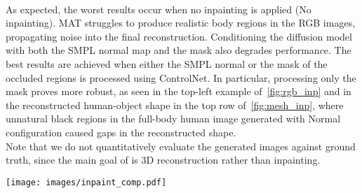 \\As expected, the worst results occur when no inpainting is applied (No inpainting). MAT struggles to produce realistic body regions in the RGB images, propagating noise into the final reconstruction. Conditioning the diffusion model with both the SMPL normal map and the mask also degrades performance. The best results are achieved when either the SMPL normal or the mask of the occluded regions is processed using ControlNet. In particular, processing only the mask proves more robust, as seen in the top-left example of~\cref{fig:rgb_inp} and in the reconstructed human-object shape in the top row of~\cref{fig:mesh_inp}, where unnatural black regions in the full-body human image generated with Normal configuration caused gaps in the reconstructed shape.
\\Note that we do not quantitatively evaluate the generated images against ground truth, since the main goal of \name is 3D reconstruction rather than inpainting.
\begin{figure*}[h]
  \centering
\texttt{[image: images/inpaint\_comp.pdf]}
\vspace{-6mm}
\caption{Human-object shapes reconstructed by changing the diffusion module of \name. Front view with and without the object and side views without the object are shown from \dataname in the top row, from BEHAVE~\cite{bhatnagar2022behave} in the bottom.}
\label{fig:mesh_inp}
\end{figure*}

